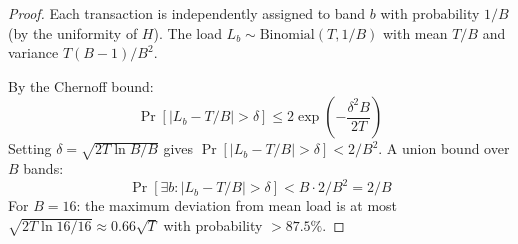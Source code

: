 \begin{proof}
Each transaction is independently assigned to band $b$ with probability $1/B$ (by
the uniformity of $H$). The load $L_b \sim \text{Binomial}(T, 1/B)$ with mean $T/B$
and variance $T(B-1)/B^2$.

By the Chernoff bound:
\[
\Pr[|L_b - T/B| > \delta] \leq 2\exp\left(-\frac{\delta^2 B}{2T}\right)
\]
Setting $\delta = \sqrt{2T \ln B / B}$ gives $\Pr[|L_b - T/B| > \delta] < 2/B^2$.
A union bound over $B$ bands:
\[
\Pr[\exists b : |L_b - T/B| > \delta] < B \cdot 2/B^2 = 2/B
\]
For $B = 16$: the maximum deviation from mean load is at most $\sqrt{2T \ln 16 / 16} \approx 0.66\sqrt{T}$
with probability $> 87.5\%$.
\end{proof}

